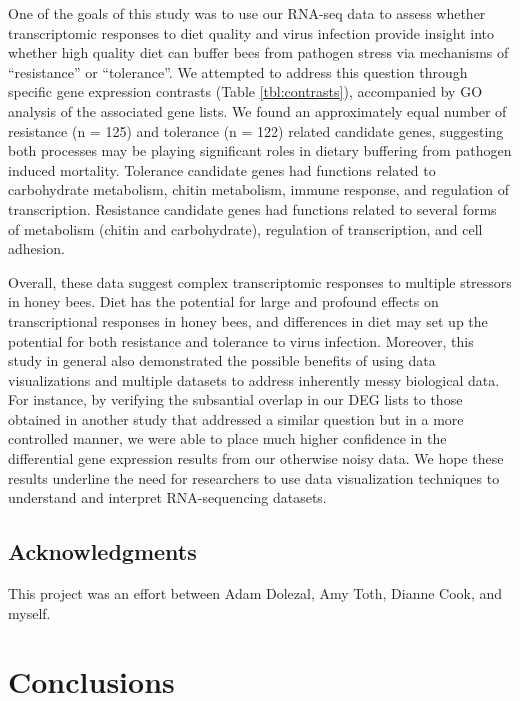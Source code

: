 \documentclass[11pt,a4paper,oldfontcommands,openany]{memoir}
\numberwithin{equation}{section} %
\begin{document}
One of the goals of this study was to use our RNA-seq data to assess whether transcriptomic responses to diet quality and virus infection provide insight into whether high quality diet can buffer bees from pathogen stress via mechanisms of ``resistance'' or ``tolerance''. We attempted to address this question through specific gene expression contrasts (Table \ref{tbl:contrasts}), accompanied by GO analysis of the associated gene lists. We found an approximately equal number of resistance (n = 125) and tolerance (n = 122) related candidate genes, suggesting both processes may be playing significant roles in dietary buffering from pathogen induced mortality. Tolerance candidate genes had functions related to carbohydrate metabolism, chitin metabolism, immune response, and regulation of transcription. Resistance candidate genes had functions related to several forms of metabolism (chitin and carbohydrate), regulation of transcription, and cell adhesion.  

Overall, these data suggest complex transcriptomic responses to multiple stressors in honey bees. Diet has the potential for large and profound effects on transcriptional responses in honey bees, and differences in diet may set up the potential for both resistance and tolerance to virus infection. Moreover, this study in general also demonstrated the possible benefits of using data visualizations and multiple datasets to address inherently messy biological data. For instance, by verifying the subsantial overlap in our DEG lists to those obtained in another study that addressed a similar question but in a more controlled manner, we were able to place much higher confidence in the differential gene expression results from our otherwise noisy data. We hope these results underline the need for researchers to use data visualization techniques to understand and interpret RNA-sequencing datasets.

\section{Acknowledgments}

This project was an effort between Adam Dolezal, Amy Toth, Dianne Cook, and myself.


\chapter{Conclusions}
\end{document}

